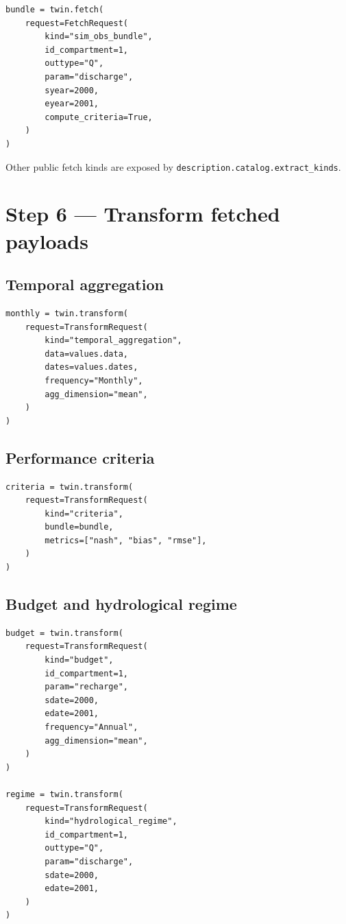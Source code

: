 \documentclass[11pt]{article}
\begin{document}
\begin{verbatim}
bundle = twin.fetch(
    request=FetchRequest(
        kind="sim_obs_bundle",
        id_compartment=1,
        outtype="Q",
        param="discharge",
        syear=2000,
        eyear=2001,
        compute_criteria=True,
    )
)
\end{verbatim}

Other public fetch kinds are exposed by \texttt{description.catalog.extract\_kinds}.

\section{Step 6 --- Transform fetched payloads}

\subsection*{Temporal aggregation}

\begin{verbatim}
monthly = twin.transform(
    request=TransformRequest(
        kind="temporal_aggregation",
        data=values.data,
        dates=values.dates,
        frequency="Monthly",
        agg_dimension="mean",
    )
)
\end{verbatim}

\subsection*{Performance criteria}

\begin{verbatim}
criteria = twin.transform(
    request=TransformRequest(
        kind="criteria",
        bundle=bundle,
        metrics=["nash", "bias", "rmse"],
    )
)
\end{verbatim}

\subsection*{Budget and hydrological regime}

\begin{verbatim}
budget = twin.transform(
    request=TransformRequest(
        kind="budget",
        id_compartment=1,
        param="recharge",
        sdate=2000,
        edate=2001,
        frequency="Annual",
        agg_dimension="mean",
    )
)

regime = twin.transform(
    request=TransformRequest(
        kind="hydrological_regime",
        id_compartment=1,
        outtype="Q",
        param="discharge",
        sdate=2000,
        edate=2001,
    )
)
\end{verbatim}
\end{document}
